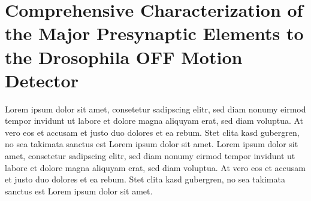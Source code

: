 \section{Comprehensive Characterization of the Major Presynaptic Elements to the Drosophila OFF Motion Detector}
\label{sct:manuscript_serbe}

Lorem ipsum dolor sit amet, consetetur sadipscing elitr, sed diam nonumy eirmod tempor invidunt ut labore et dolore magna aliquyam erat, sed diam voluptua. At vero eos et accusam et justo duo dolores et ea rebum. Stet clita kasd gubergren, no sea takimata sanctus est Lorem ipsum dolor sit amet. Lorem ipsum dolor sit amet, consetetur sadipscing elitr, sed diam nonumy eirmod tempor invidunt ut labore et dolore magna aliquyam erat, sed diam voluptua. At vero eos et accusam et justo duo dolores et ea rebum. Stet clita kasd gubergren, no sea takimata sanctus est Lorem ipsum dolor sit amet.

\newpage

